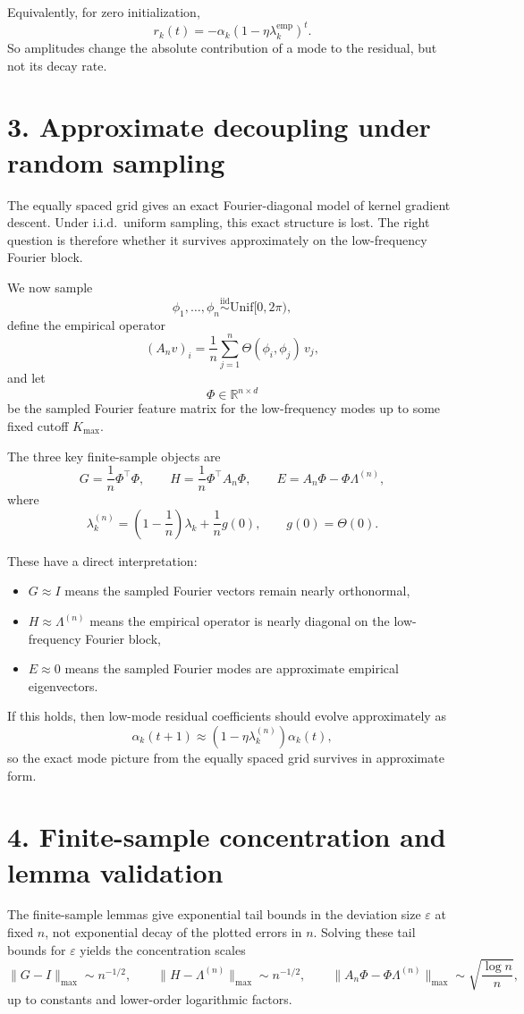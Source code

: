 \documentclass[11pt]{article}
\begin{document}
Equivalently, for zero initialization,
\[
	r_k(t)=-\alpha_k(1-\eta\lambda_k^{\mathrm{emp}})^t.
\]
So amplitudes change the absolute contribution of a mode to the residual, but not its decay rate.

\section*{3. Approximate decoupling under random sampling}

The equally spaced grid gives an exact Fourier-diagonal model of kernel gradient descent. Under i.i.d.\ uniform sampling, this exact structure is lost. The right question is therefore whether it survives approximately on the low-frequency Fourier block.

We now sample
\[
	\phi_1,\dots,\phi_n \overset{\mathrm{iid}}{\sim} \mathrm{Unif}[0,2\pi),
\]
define the empirical operator
\[
	(A_n v)_i=\frac1n\sum_{j=1}^n \Theta(\phi_i,\phi_j)\,v_j,
\]
and let
\[
	\Phi\in\mathbb{R}^{n\times d}
\]
be the sampled Fourier feature matrix for the low-frequency modes up to some fixed cutoff $K_{\max}$.

The three key finite-sample objects are
\[
	G=\frac1n\Phi^\top\Phi,
	\qquad
	H=\frac1n\Phi^\top A_n\Phi,
	\qquad
	E=A_n\Phi-\Phi\Lambda^{(n)},
\]
where
\[
	\lambda_k^{(n)}=\left(1-\frac1n\right)\lambda_k+\frac1n g(0),
	\qquad
	g(0)=\Theta(0).
\]

These have a direct interpretation:
\begin{itemize}
	\item $G\approx I$ means the sampled Fourier vectors remain nearly orthonormal,
	\item $H\approx \Lambda^{(n)}$ means the empirical operator is nearly diagonal on the low-frequency Fourier block,
	\item $E\approx 0$ means the sampled Fourier modes are approximate empirical eigenvectors.
\end{itemize}

If this holds, then low-mode residual coefficients should evolve approximately as
\[
	\alpha_k(t+1)\approx (1-\eta\lambda_k^{(n)})\alpha_k(t),
\]
so the exact mode picture from the equally spaced grid survives in approximate form.

\section*{4. Finite-sample concentration and lemma validation}

The finite-sample lemmas give exponential tail bounds in the deviation size $\varepsilon$ at fixed $n$, not exponential decay of the plotted errors in $n$. Solving these tail bounds for $\varepsilon$ yields the concentration scales
\[
	\|G-I\|_{\max}\sim n^{-1/2},
	\qquad
	\|H-\Lambda^{(n)}\|_{\max}\sim n^{-1/2},
	\qquad
	\|A_n\Phi-\Phi\Lambda^{(n)}\|_{\max}\sim \sqrt{\frac{\log n}{n}},
\]
up to constants and lower-order logarithmic factors.
\end{document}

